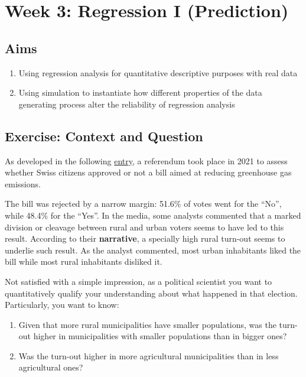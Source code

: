 \documentclass[
]{book}
\providecommand{\tightlist}{%
  \setlength{\itemsep}{0pt}\setlength{\parskip}{0pt}}
\begin{document}
\hypertarget{week-3-regression-i-prediction}{%
\chapter{Week 3: Regression I (Prediction)}\label{week-3-regression-i-prediction}}

\hypertarget{aims-1}{%
\section{Aims}\label{aims-1}}

\begin{enumerate}
\def\labelenumi{\arabic{enumi}.}
\tightlist
\item
  Using regression analysis for quantitative descriptive purposes with real data
\item
  Using simulation to instantiate how different properties of the data generating process alter the reliability of regression analysis
\end{enumerate}

\hypertarget{exercise-context-and-question}{%
\section{Exercise: Context and Question}\label{exercise-context-and-question}}

As developed in the following \href{https://de.wikipedia.org/wiki/Eidgen\%C3\%B6ssische_Abstimmung_\%C3\%BCber_die_Totalrevision_des_CO2-Gesetzes\#:~:text=Die\%20Eidgen\%C3\%B6ssische\%20Abstimmung\%20\%C3\%BCber\%20die,von\%2051\%2C59\%20\%25\%20abgelehnt.}{entry}, a referendum took place in 2021 to assess whether Swiss citizens approved or not a bill aimed at reducing greenhouse gas emissions.

The bill was rejected by a narrow margin: 51.6\% of votes went for the ``No'', while 48.4\% for the ``Yes''. In the media, some analysts commented that a marked division or cleavage between rural and urban voters seems to have led to this result. According to their \textbf{narrative}, a specially high rural turn-out seems to underlie such result. As the analyst commented, most urban inhabitants liked the bill while most rural inhabitants disliked it.

Not satisfied with a simple impression, as a political scientist you want to quantitatively qualify your understanding about what happened in that election. Particularly, you want to know:

\begin{enumerate}
\def\labelenumi{\arabic{enumi}.}
\tightlist
\item
  Given that more rural municipalities have smaller populations, was the turn-out higher in municipalities with smaller populations than in bigger ones?
\item
  Was the turn-out higher in more agricultural municipalities than in less agricultural ones?
\end{enumerate}
\end{document}
